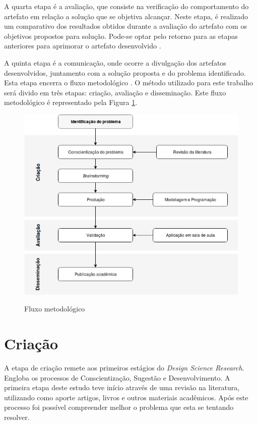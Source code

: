 \documentclass[
	12pt,				%
	oneside,			%
	a4paper,			%
	english,			%
	french,				%
	spanish,			%
	brazil,				%
	]{abntex2}
\begin{document}
A quarta etapa é a avaliação, que consiste na verificação do comportamento do artefato em relação a solução que se objetiva alcançar. Neste etapa, é realizado um comparativo dos resultados obtidos durante a avaliação do artefato com os objetivos propostos para solução. Pode-se optar pelo retorno para as etapas anteriores para aprimorar o artefato desenvolvido \cite{dresch:2015}.

A quinta etapa é a comunicação, onde ocorre a divulgação dos artefatos desenvolvidos, juntamento com a solução proposta e do problema identificado. Esta etapa encerra o fluxo metodológico \cite{dresch:2015}. O método utilizado para este trabalho será divido em três etapas: criação, avaliação e disseminação. Este fluxo metodológico é representado pela Figura \ref{fig:fluxoMetologico}.

\begin{figure}[H]
\centering
\caption{Fluxo metodológico}
\includegraphics[width=1\textwidth]{imagens/dsr.jpg}
\label{fig:fluxoMetologico}
\sourceAuthor
\end{figure}

\section{Criação}

A etapa de criação remete aos primeiros estágios do \textit{Design Science Research}. Engloba os processos de Conscientização, Sugestão e Desenvolvimento. A primeira etapa deste estudo teve início através de uma revisão na literatura, utilizando como aporte artigos, livros e outros materiais acadêmicos. Após este processo foi possível compreender melhor o problema que esta se tentando resolver.
\end{document}
